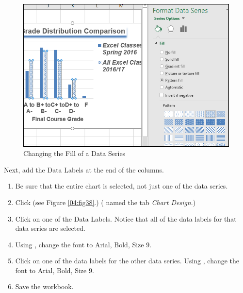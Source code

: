 \begin{figure}[H]
	\centering
	\includegraphics[width=\maxwidth{.95\linewidth}]{gfx/ch04_fig37}
	\caption{Changing the Fill of a Data Series}
	\label{04:fig37}
\end{figure}

Next, add the Data Labels at the end of the columns.

\begin{enumerate}
	\item Be sure that the entire chart is selected, not just one of the data series. 
	\item Click  (see Figure \ref{04:fig38}.) ( named the tab \textit{Chart Design}.)
	\item Click on one of the Data Labels. Notice that all of the data labels for that data series are selected.
	\item Using , change the font to Arial, Bold, Size $ 9 $.
	\item Click on one of the data labels for the other data series. Using , change the font to Arial, Bold, Size $ 9 $.
	\item Save the workbook.
\end{enumerate}

